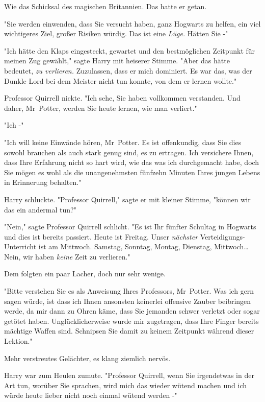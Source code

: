 {Wie das Schicksal des magischen Britannien. Das hatte er getan.

"Sie werden einwenden, dass Sie versucht haben, ganz Hogwarts zu helfen, ein viel wichtigeres Ziel, großer Risiken würdig. Das ist eine \emph{Lüge.} Hätten Sie -"

"Ich hätte den Klaps eingesteckt, gewartet und den bestmöglichen Zeitpunkt für meinen Zug gewählt," sagte Harry mit heiserer Stimme. "Aber das hätte bedeutet, \emph{zu verlieren.} Zuzulassen, dass er mich dominiert. Es war das, was der Dunkle Lord bei dem Meister nicht tun konnte, von dem er lernen wollte."

Professor Quirrell nickte. "Ich sehe, Sie haben vollkommen verstanden. Und daher, Mr~Potter, werden Sie heute lernen, wie man verliert."

"Ich -"

"Ich will keine Einwände hören, Mr~Potter. Es ist offenkundig, dass Sie dies sowohl brauchen als auch stark genug sind, es zu ertragen. Ich versichere Ihnen, dass Ihre Erfahrung nicht so hart wird, wie das was ich durchgemacht habe, doch Sie mögen es wohl als die unangenehmsten fünfzehn Minuten Ihres jungen Lebens in Erinnerung behalten."

Harry schluckte. "Professor Quirrell," sagte er mit kleiner Stimme, "können wir das ein andermal tun?"

"Nein," sagte Professor Quirrell schlicht. "Es ist Ihr fünfter Schultag in Hogwarts und dies ist bereits passiert. Heute ist Freitag. Unser \emph{nächster} Verteidigungs-Unterricht ist am Mittwoch. Samstag, Sonntag, Montag, Dienstag, Mittwoch… Nein, wir haben \emph{keine} Zeit zu verlieren."

Dem folgten ein paar Lacher, doch nur sehr wenige.

"Bitte verstehen Sie es als Anweisung Ihres Professors, Mr~Potter. Was ich gern sagen würde, ist dass ich Ihnen ansonsten keinerlei offensive Zauber beibringen werde, da mir dann zu Ohren käme, dass Sie jemanden schwer verletzt oder sogar getötet haben. Unglücklicherweise wurde mir zugetragen, dass Ihre Finger bereits mächtige Waffen sind. Schnipsen Sie damit zu keinem Zeitpunkt während dieser Lektion."

Mehr verstreutes Gelächter, es klang ziemlich nervös.

Harry war zum Heulen zumute. "Professor Quirrell, wenn Sie irgendetwas in der Art tun, worüber Sie sprachen, wird mich das wieder wütend machen und ich würde heute lieber nicht noch einmal wütend werden -"

}
